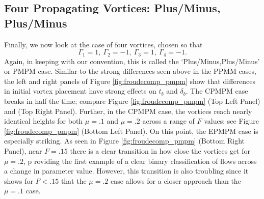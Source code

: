 \documentclass[a4paper,11pt]{article}
\begin{document}
\subsection{Four Propagating Vortices: Plus/Minus, Plus/Minus}
Finally, we now look at the case of four vortices, chosen so that
\[
\Gamma_{1}=1,~\Gamma_{2}=-1, ~ \Gamma_{3}=1,~\Gamma_{4}=-1.
\]
Again, in keeping with our convention, this is called the `Plus/Minus,Plus/Minus' or PMPM case.  Similar to the strong differences seen above in the PPMM cases, the left and right panels of Figure \ref{fig:froudecomp_pmpm} show that differences in initial vortex placement have strong effects on $t_{b}$ and $\delta_{b}$.  The CPMPM case breaks in half the time; compare Figure \ref{fig:froudecomp_pmpm} (Top Left Panel) and (Top Right Panel).  Further, in the CPMPM case, the vortices reach nearly identical heights for both $\mu=.1$ and $\mu=.2$ across a range of $F$ values; see Figure \ref{fig:froudecomp_pmpm} (Bottom Left Panel).  On this point, the EPMPM case is especially striking.  As seen in Figure \ref{fig:froudecomp_pmpm} (Bottom Right Panel), near $F=.15$ there is a clear transition in how close the vortices get for $\mu=.2$, p roviding the first example of a clear binary classification of flows across a change in parameter value.  However, this transition is also troubling since it shows for $F<.15$ that the $\mu=.2$ case allows for a closer approach than the $\mu=.1$ case.    
\end{document}
